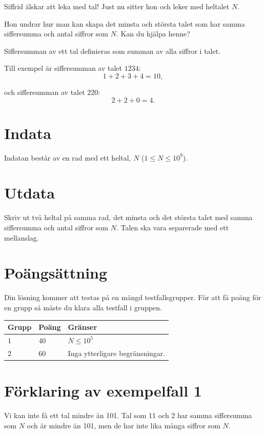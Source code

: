 \noindent
Siffrid älskar att leka med tal! Just nu sitter hon och leker med heltalet $N$.

Hon undrar hur man kan skapa det minsta och största talet som har samma siffersumma och antal siffror som $N$.
Kan du hjälpa henne?

Siffersumman av ett tal definieras som summan av alla siffror i talet. 

\noindent
Till exempel är siffersumman av talet $1234$: 
$$
1 + 2 + 3 + 4 = 10,
$$

och siffersumman av talet $220$:
$$
2 + 2 + 0 = 4.
$$


\section*{Indata}
Indatan består av en rad med ett heltal, $N$ ($1 \le N \le 10^9$).

\section*{Utdata}
Skriv ut två heltal på samma rad, det minsta och det största talet med samma siffersumma och antal siffror som $N$.
Talen ska vara separerade med ett mellanslag.

\section*{Poängsättning}
Din lösning kommer att testas på en mängd testfallsgrupper.
För att få poäng för en grupp så måste du klara alla testfall i gruppen.

\noindent
\begin{tabular}{| l | l | p{12cm} |}
  \hline
  \textbf{Grupp} & \textbf{Poäng} & \textbf{Gränser} \\ \hline
  $1$    & $40$       & $N \leq 10^5$ \\ \hline
  $2$    & $60$       & Inga ytterligare begränsningar. \\ \hline
\end{tabular}

\section*{Förklaring av exempelfall 1}
Vi kan inte få ett tal mindre än 101. Tal som 11 och 2 har samma siffersumma som $N$ och är mindre än 101,
men de har inte lika många siffror som $N$.
